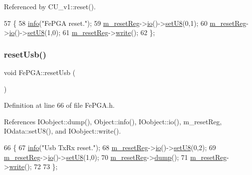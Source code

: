 Referenced by C\+U\+\_\+v1\+::reset().


\begin{DoxyCode}
57                \{
58     \hyperlink{classObject_a644fd329ea4cb85f54fa6846484b84a8}{info}(\textcolor{stringliteral}{"FePGA reset."});
59     \hyperlink{classFePGA_aeff1a2370237a06b50e1ae23d933c862}{m\_resetReg}->\hyperlink{classIOobject_af04fb94137c3d86849f478ac5afab5d1}{io}()->\hyperlink{classIOdata_a6c4fb2f2af01889ada889c2b7aceb24d}{setU8}(0,1);
60     \hyperlink{classFePGA_aeff1a2370237a06b50e1ae23d933c862}{m\_resetReg}->\hyperlink{classIOobject_af04fb94137c3d86849f478ac5afab5d1}{io}()->\hyperlink{classIOdata_a6c4fb2f2af01889ada889c2b7aceb24d}{setU8}(1,0);
61     \hyperlink{classFePGA_aeff1a2370237a06b50e1ae23d933c862}{m\_resetReg}->\hyperlink{classIOobject_a9f6984bc9f0fadcf800f1be2523ac744}{write}();
62   \};
\end{DoxyCode}
\mbox{\label{classFePGA_a79d95b2fccf4d2ea473e6cf6980d6cf6}} 
\subsubsection{\texorpdfstring{reset\+Usb()}{resetUsb()}}
{\footnotesize\ttfamily void Fe\+P\+G\+A\+::reset\+Usb (\begin{DoxyParamCaption}{ }\end{DoxyParamCaption})\hspace{0.3cm}{\ttfamily [inline]}}



Definition at line 66 of file Fe\+P\+G\+A.\+h.



References I\+Oobject\+::dump(), Object\+::info(), I\+Oobject\+::io(), m\+\_\+reset\+Reg, I\+Odata\+::set\+U8(), and I\+Oobject\+::write().


\begin{DoxyCode}
66                  \{
67     \hyperlink{classObject_a644fd329ea4cb85f54fa6846484b84a8}{info}(\textcolor{stringliteral}{"Usb TxRx reset."});
68     \hyperlink{classFePGA_aeff1a2370237a06b50e1ae23d933c862}{m\_resetReg}->\hyperlink{classIOobject_af04fb94137c3d86849f478ac5afab5d1}{io}()->\hyperlink{classIOdata_a6c4fb2f2af01889ada889c2b7aceb24d}{setU8}(0,2);
69     \hyperlink{classFePGA_aeff1a2370237a06b50e1ae23d933c862}{m\_resetReg}->\hyperlink{classIOobject_af04fb94137c3d86849f478ac5afab5d1}{io}()->\hyperlink{classIOdata_a6c4fb2f2af01889ada889c2b7aceb24d}{setU8}(1,0); 
70     \hyperlink{classFePGA_aeff1a2370237a06b50e1ae23d933c862}{m\_resetReg}->\hyperlink{classIOobject_a1247f08c84c1732a76caf07e987871e9}{dump}();
71     \hyperlink{classFePGA_aeff1a2370237a06b50e1ae23d933c862}{m\_resetReg}->\hyperlink{classIOobject_a9f6984bc9f0fadcf800f1be2523ac744}{write}();
72     
73   \};
\end{DoxyCode}
\mbox{\label{classFePGA_a2da860f836e04ecc54056d0bf8cc8f98}} 
